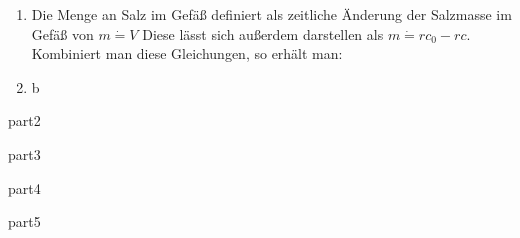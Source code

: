 \documentclass[german]{uebung}
\begin{document}
\begin{exercise}{1}
	\begin{enumerate}[label=(\alph*)]
		\item
	Die Menge an Salz im Gef\"a{\ss} definiert als%
			zeitliche {\"A}nderung der Salzmasse im Gef\"a{\ss} von $m\dot = V $%
	Diese l\"asst sich au{\ss}erdem darstellen als $m\dot = rc_0 - rc$.\\
	Kombiniert man diese Gleichungen, so erh\"alt man:


		\item b
	\end{enumerate}
\end{exercise}

\begin{exercise}{2}
	part2
\end{exercise}

\begin{exercise}{3}
	part3
\end{exercise}


\begin{exercise}{4}
	part4
\end{exercise}


\begin{exercise}{5}
	part5
\end{exercise}
\end{document}
